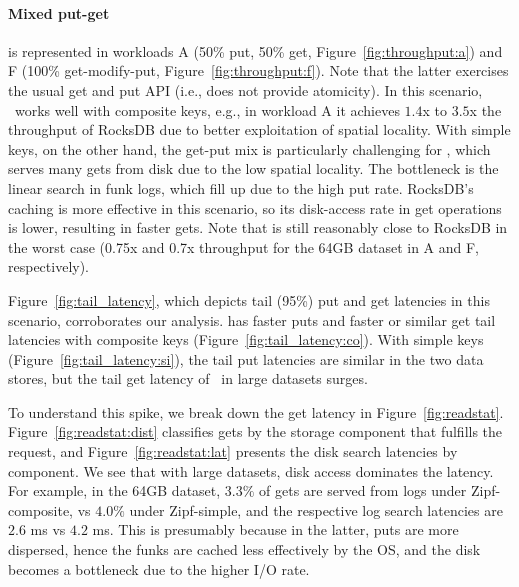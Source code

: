 \paragraph{ Mixed put-get} is represented in workloads A (50\% put, 50\% get, Figure~\ref{fig:throughput:a}) and 
F (100\% get-modify-put, Figure~\ref{fig:throughput:f}). Note that the latter exercises the usual get and put API (i.e., does not provide atomicity). 
In this scenario, \sys\ works well with composite keys, e.g., in workload A it  achieves $1.4$x to $3.5$x the throughput of RocksDB due to better exploitation of spatial locality. 
With simple keys, on the other hand, the get-put mix is particularly challenging for \sys, which serves many gets from disk due to the
low spatial locality. The bottleneck is the linear search in funk logs, which  fill
up due to the high put rate.
RocksDB's caching is more effective in this scenario, so its disk-access rate in get operations is lower,  resulting in faster gets. 
Note that \sys\/ is still reasonably close to RocksDB in the worst case 
(0.75x and 0.7x throughput for the 64GB dataset in A and F, respectively).

Figure~\ref{fig:tail_latency}, which depicts tail (95\%) put and get latencies in this scenario, 
corroborates our analysis. \sys\/ has faster puts and faster or similar get tail latencies with composite keys
(Figure~\ref{fig:tail_latency:co}). With simple keys (Figure~\ref{fig:tail_latency:si}),  
the tail put latencies are similar in the two data stores, but the tail get latency of \sys\ 
in large datasets surges.

 To understand this spike, 
we break down the get latency in  Figure~\ref{fig:readstat}. 
Figure~\ref{fig:readstat:dist} classifies gets by the storage  component 
that fulfills the request, and Figure~\ref{fig:readstat:lat} presents the disk search latencies by component. 
We see that with large datasets, disk access dominates the latency.
For example, in the 64GB dataset, $3.3\%$ of gets are served from logs under Zipf-composite, vs $4.0\%$ under Zipf-simple,
and the respective log search latencies are $2.6$ ms vs $4.2$ ms. This is presumably because in the latter, puts are more dispersed, 
hence the funks are cached less effectively by the OS, and the disk becomes a bottleneck due to the higher I/O rate.

